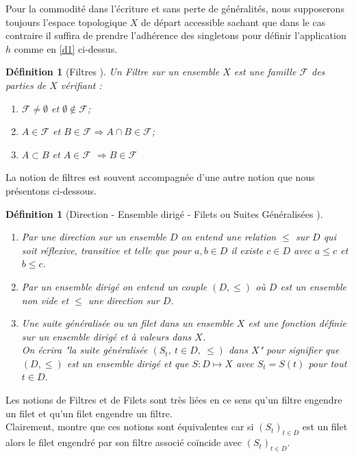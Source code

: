 \documentclass[11pt]{report}
\newenvironment{boxdefinition}
{\begin{tcolorbox}
		[enhanced jigsaw,breakable,pad at break*=1mm,
		colback=black!5!white,boxrule=0pt,frame hidden,
		borderline west={1.5mm}{-2mm}{blue}]}
	{\end{tcolorbox}}
\theoremstyle{styletheorem}
\theoremstyle{styledef}
\newtheorem{definitions}[theoreme]{Définition}
\theoremstyle{remark}
\newenvironment{definition}{\vspace*{0.3cm}\begin{boxdefinition}\begin{definitions}}{\end{definitions}\end{boxdefinition}\vspace*{0.3cm}}
\newcommand{\Fr}{\ensuremath{\mathcal{F}}  }
\begin{document}
Pour la commodité dans l'écriture et sans perte de  généralités, nous supposerons toujours l'espace topologique $X$ de départ accessible sachant que dans le cas contraire il suffira de prendre l'adhérence des singletons pour définir l'application $h$ comme en \ref{d1} ci-dessus.\\ 
\begin{definition}[Filtres \cite{b11}]
	Un Filtre sur un ensemble $X$ est une famille $\Fr$ des parties de $X$ vérifiant : 
	\begin{enumerate}[label = $\bullet$]
		\item $\Fr \neq \emptyset$ et $\emptyset \notin \Fr$;
		\item $A\in \Fr$ et $B \in \Fr \Rightarrow A \cap B \in \Fr$;
		\item $A \subset B $ et $A \in \Fr$ $\Rightarrow B \in \Fr$
	\end{enumerate}
\end{definition}
La notion de filtres est souvent accompagnée d'une autre notion que nous présentons ci-dessous.
\begin{definition}[Direction - Ensemble dirigé - Filets ou Suites Généralisées \cite{b11}]\ 
	\begin{enumerate}[label=$\bullet$]
		\item Par une direction sur un ensemble $D$ on entend une relation $\leq$ sur $D$ qui soit réflexive, transitive et telle que pour $a,b \in D$ il existe $c\in D$ avec $a\leq c$ et $b \leq c$.
		\item Par un ensemble dirigé on entend un couple $(D,\leq)$ où $D$ est un ensemble non vide et  $\leq$ une direction sur $D$.
		\item Une suite généralisée ou un filet dans un ensemble $X$ est une fonction définie sur un ensemble dirigé et à valeurs dans $X$.\\
		On écrira "la suite généralisée $(S_t,\ t \in D,\ \leq)$ dans $X$" pour signifier que $(D,\leq)$ est un ensemble dirigé et que $S \colon D \longmapsto X$ avec $S_t = S(t)$ pour tout $t \in  D$.
	\end{enumerate}
\end{definition}
Les notions de Filtres et de Filets sont très liées en ce sens qu'un filtre engendre un filet et qu'un filet engendre un filtre.\\
Clairement, \cite{b11} montre que ces notions sont équivalentes car si $(S_t)_{t\in D}$  est un filet alors le filet engendré par son filtre associé coïncide avec $ (S_t)_{t\in D}$.\\
\end{document}
